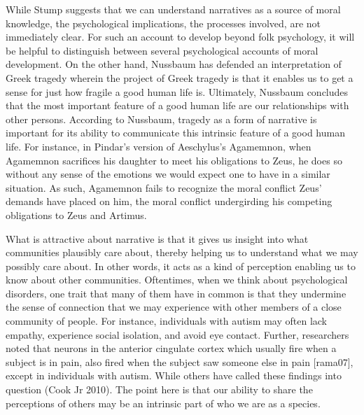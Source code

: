 \documentclass[12pt]{book}
\theoremstyle{definition}
\theoremstyle{remark}
\begin{document}
While Stump suggests that we can understand narratives as a source of moral knowledge, the psychological implications, the processes involved, are not immediately clear. For such an account to develop beyond folk psychology, it will be helpful to distinguish between several psychological accounts of moral development. On the other hand, Nussbaum has defended an interpretation of Greek tragedy wherein the project of Greek tragedy is that it enables us to get a sense for just how fragile a good human life is. Ultimately, Nussbaum concludes that the most important feature of a good human life are our relationships with other persons. According to Nussbaum, tragedy as a form of narrative is important for its ability to communicate this intrinsic feature of a good human life. For instance, in Pindar's version of Aeschylus's Agamemnon, when Agamemnon sacrifices his daughter to meet his obligations to Zeus, he does so without any sense of the emotions we would expect one to have in a similar situation. As such, Agamemnon fails to recognize the moral conflict Zeus' demands have placed on him, the moral conflict undergirding his competing obligations to Zeus and Artimus.

What is attractive about narrative is that it gives us insight into what communities plausibly care about, thereby helping us to understand what we may possibly care about. In other words, it acts as a kind of perception enabling us to know about other communities. Oftentimes, when we think about psychological disorders, one trait that many of them have in common is that they undermine the sense of connection that we may experience with other members of a close community of people. For instance, individuals with autism may often lack empathy, experience social isolation, and avoid eye contact. Further, researchers noted that neurons in the anterior cingulate cortex which usually fire when a subject is in pain, also fired when the subject saw someone else in pain {[}rama07{]}, except in individuals with autism. While others have called these findings into question (Cook Jr 2010). The point here is that our ability to share the perceptions of others may be an intrinsic part of who we are as a species.
\end{document}
